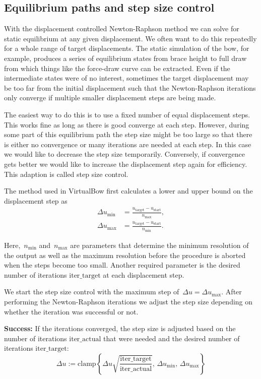 \subsection{Equilibrium paths and step size control}

With the displacement controlled Newton-Raphson method we can solve for static equilibrium at any given displacement.
We often want to do this repeatedly for a whole range of target displacements.
The static simulation of the bow, for example, produces a series of equilibrium states from brace height to full draw from which things like the force-draw curve can be extracted.
Even if the intermediate states were of no interest, sometimes the target displacement may be too far from the initial displacement such that the Newton-Raphson iterations only converge if multiple smaller displacement steps are being made.

The easiest way to do this is to use a fixed number of equal displacement steps.
This works fine as long as there is good converge at each step.
However, during some part of this equilibrium path the step size might be too large so that there is either no convergence or many iterations are needed at each step.
In this case we would like to decrease the step size temporarily.
Conversely, if convergence gets better we would like to increase the displacement step again for efficiency.
This adaption is called step size control.

The method used in VirtualBow first calculates a lower and upper bound on the displacement step as
%
\begin{align}
\Delta u_\mathrm{min} &= \frac{u_\mathrm{target} - u_\mathrm{start}}{n_\mathrm{max}}, \\
\Delta u_\mathrm{max} &= \frac{u_\mathrm{target} - u_\mathrm{start}}{n_\mathrm{min}}.
\end{align}

Here,~$n_\mathrm{min}$ and~$n_\mathrm{max}$ are parameters that determine the minimum resolution of the output as well as the maximum resolution before the procedure is aborted when the steps become too small.
Another required parameter is the desired number of iterations $\mathrm{iter\_target}$ at each displacement step.

We start the step size control with the maximum step of~$\Delta u = \Delta u_\mathrm{max}$.
After performing the Newton-Raphson iterations we adjust the step size depending on whether the iteration was successful or not.

\textbf{Success:} If the iterations converged, the step size is adjusted based on the number of iterations $\mathrm{iter\_actual}$ that were needed and the desired number of iterations $\mathrm{iter\_target}$:
%
$$
\Delta u := \mathrm{clamp} \left\lbrace \Delta u \sqrt{\frac{\mathrm{iter\_target}}{\mathrm{iter\_actual}}},\,\Delta u_\mathrm{min},\,\Delta u_\mathrm{max} \right\rbrace
$$

